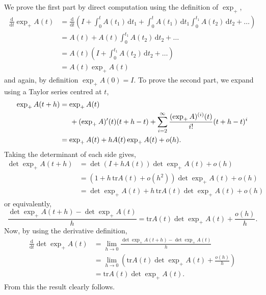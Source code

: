 \documentclass[a4paper,12pt,draft]{report}
\theoremstyle{remark}
\theoremstyle{definition}
\begin{document}
{
We prove the first part by direct computation using the definition of $\exp_+$,
\begin{align}
\frac{\mathrm{d}}{\mathrm{d} t}\exp_+ A(t) & = \frac{\mathrm{d}}{\mathrm{d} t}\left(I + \int_0^t A(t_1)\,\mathrm{d} t_1 + \int_0^t A(t_1)\,\mathrm{d} t_1 \int_0^{t_1} A(t_2)\,\mathrm{d} t_2 + \dots\right)\nonumber\\
& = A(t) + A(t)\int_0^{t_1}A(t_2)\,\mathrm{d} t_2 + \dots\nonumber\\
& = A(t)\left(I + \int_0^{t_1} A(t_2)\,\mathrm{d} t_2 + \dots \right)\nonumber\\
& = A(t)\exp_+A(t)\nonumber
\end{align}
and again, by definition $\exp_+A(0) = I$.  To prove the second part, we expand using a Taylor series centred at $t$,
\begin{align}
\exp_+A(t + h) & = \exp_+A(t) \nonumber\\
& \hspace{0.5cm} + (\exp_+A)'(t)(t + h - t) + \sum_{i = 2}^\infty \frac{(\exp_+A)^{(i)}(t)}{i!}(t + h - t)^i \nonumber\\
& = \exp_+A(t) + hA(t)\exp_+A(t) + o(h). \nonumber
\end{align}
Taking the determinant of each side gives,
\begin{align}
\det\exp_+A(t + h) & = \det(I + hA(t))\det\exp_+A(t) + o(h)\nonumber\\
& = (1 + h\,\mathrm{tr}A(t) + o(h^2))\det\exp_+A(t) + o(h)\nonumber\\
& = \det\exp_+A(t) + h\,\mathrm{tr}A(t)\det\exp_+A(t) + o(h)\nonumber
\end{align}
or equivalently,
$$
\frac{\det\exp_+A(t + h) - \det\exp_+A(t)}{h} = \mathrm{tr}A(t)\det\exp_+A(t) + \frac{o(h)}{h}.
$$
Now, by using the derivative definition,
\begin{align}
\frac{\mathrm{d}}{\mathrm{d}t}\det\exp_+A(t) & = \lim_{h \to 0} \frac{\det\exp_+A(t + h) - \det\exp_+A(t)}{h}\nonumber\\
& = \lim_{h \to 0}\left(\mathrm{tr}A(t)\det\exp_+A(t) + \frac{o(h)}{h}\right)\nonumber\\
& = \mathrm{tr}A(t)\det\exp_+A(t).\nonumber
\end{align}
From this the result clearly follows.

\qedhere
}
\end{document}
